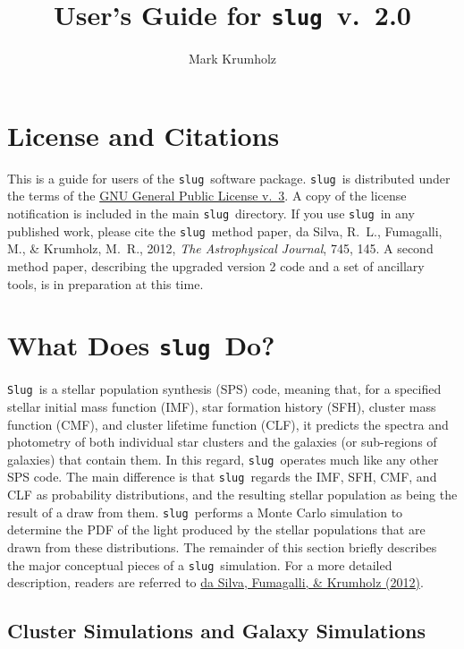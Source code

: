 \documentclass[12pt]{article}
\newcommand{\slug}{\texttt{slug}}
\newcommand{\Slug}{\texttt{Slug}}
\begin{document}
\title{User's Guide for \slug\ v.~2.0}
\author{Mark Krumholz}

\maketitle

\tableofcontents

\clearpage

\section{License and Citations}

This is a guide for users of the \slug\ software package. \slug\ is distributed under the terms of the \href{http://www.gnu.org/licenses/gpl.html}{GNU General Public License v.~3}. A copy of the license notification is included in the main \slug\ directory. If you use \slug\ in any published work, please cite the \slug\ method paper, da Silva, R.~L., Fumagalli, M., \& Krumholz, M.~R., 2012, \textit{The Astrophysical Journal}, 745, 145. A second method paper, describing the upgraded version 2 code and a set of ancillary tools, is in preparation at this time.

\section{What Does \slug\ Do?}

\Slug\ is a stellar population synthesis (SPS) code, meaning that, for a specified stellar initial mass function (IMF), star formation history (SFH), cluster mass function (CMF), and cluster lifetime function (CLF), it predicts the spectra and photometry of both individual star clusters and the galaxies (or sub-regions of galaxies) that contain them. In this regard, \slug\ operates much like any other SPS code. The main difference is that \slug\ regards the IMF, SFH, CMF, and CLF as probability distributions, and the resulting stellar population as being the result of a draw from them. \slug\ performs a Monte Carlo simulation to determine the PDF of the light produced by the stellar populations that are drawn from these distributions. The remainder of this section briefly describes the major conceptual pieces of a \slug\ simulation. For a more detailed description, readers are referred to \href{http://adsabs.harvard.edu/abs/2012ApJ...745..145D}{da Silva, Fumagalli, \& Krumholz (2012)}.

\subsection{Cluster Simulations and Galaxy Simulations}
\end{document}
